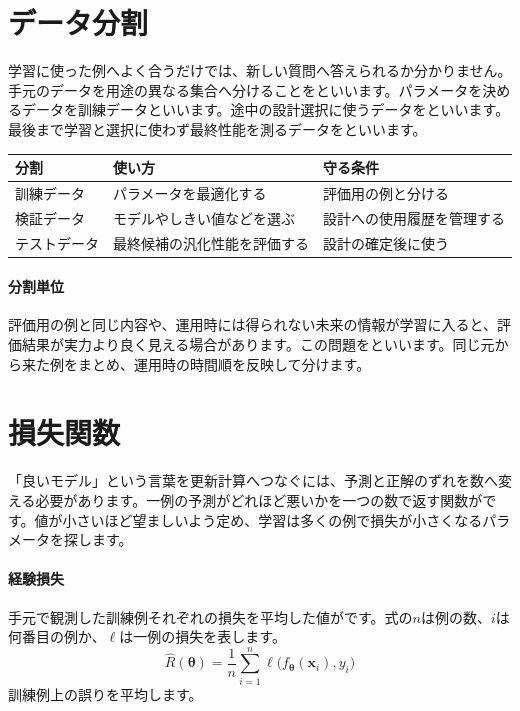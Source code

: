 \par
\endgroup


\section{データ分割}
\label{sec:06-machine-learning-06}

学習に使った例へよく合うだけでは、新しい質問へ答えられるか分かりません。手元のデータを用途の異なる集合へ分けることをといいます。パラメータを決めるデータを訓練データといいます。途中の設計選択に使うデータをといいます。最後まで学習と選択に使わず最終性能を測るデータをといいます。

\begingroup
  \noindent
  \begin{tabularx}{\textwidth}{@{}lYY@{}}
    \toprule
    分割 & 使い方 & 守る条件\\
    \midrule
    訓練データ & パラメータを最適化する & 評価用の例と分ける\\
    検証データ & モデルやしきい値などを選ぶ & 設計への使用履歴を管理する\\
    テストデータ & 最終候補の汎化性能を評価する & 設計の確定後に使う\\
    \bottomrule
  \end{tabularx}
  \vspace{4mm}
\paragraph{分割単位}
    評価用の例と同じ内容や、運用時には得られない未来の情報が学習に入ると、評価結果が実力より良く見える場合があります。この問題をといいます。同じ元から来た例をまとめ、運用時の時間順を反映して分けます。

\par
\endgroup


\section{損失関数}
\label{sec:06-machine-learning-07}

「良いモデル」という言葉を更新計算へつなぐには、予測と正解のずれを数へ変える必要があります。一例の予測がどれほど悪いかを一つの数で返す関数がです。値が小さいほど望ましいよう定め、学習は多くの例で損失が小さくなるパラメータを探します。

\begingroup
\begingroup
\paragraph{経験損失}
        手元で観測した訓練例それぞれの損失を平均した値がです。式の$n$は例の数、$i$は何番目の例か、$\ell$は一例の損失を表します。
        \[
          \hat{R}(\boldsymbol{\theta})=
          \frac{1}{n}\sum_{i=1}^{n}
          \ell\bigl(f_{\boldsymbol{\theta}}(\mathbf{x}_i),y_i\bigr)
        \]
        訓練例上の誤りを平均します。

